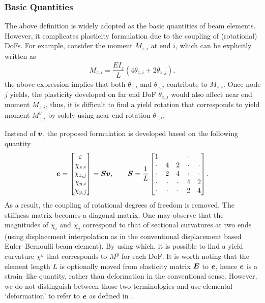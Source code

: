 \subsubsection{Basic Quantities}
The above definition is widely adopted as the basic quantities of beam elements.
However, it complicates plasticity formulation due to the coupling of (rotational) DoFs. For example, consider the moment $M_{z,i}$ at end $i$, which can be explicitly written as
\begin{gather}\label{eq:redefine}
M_{z,i}=\dfrac{EI_z}{L}\left(4\theta_{z,i}+2\theta_{z,j}\right),
\end{gather}
the above expression implies that both $\theta_{z,i}$ and $\theta_{z,j}$ contribute to $M_{z,i}$.
Once node $j$ yields, the plasticity developed on far end DoF $\theta_{z,j}$ would also affect near end moment $M_{z,i}$, thus, it is difficult to find a yield rotation that corresponds to yield moment $M^y_{z,i}$ by solely using near end rotation $\theta_{z,i}$.

Instead of $\bm{v}$, the proposed formulation is developed based on the following quantity
\begin{gather}\label{nm:kinematics}
\bm{e}=\begin{bmatrix}
\varepsilon\\\chi_{z,i}\\\chi_{z,j}\\\chi_{y,i}\\\chi_{y,j}
\end{bmatrix}=\bm{S}\bm{v},\qquad\bm{S}=\dfrac{1}{L}\begin{bmatrix}
1&\cdot&\cdot&\cdot&\cdot\\
\cdot&4&2&\cdot&\cdot\\
\cdot&2&4&\cdot&\cdot\\
\cdot&\cdot&\cdot&4&2\\
\cdot&\cdot&\cdot&2&4
\end{bmatrix}.
\end{gather}
As a result, the coupling of rotational degrees of freedom is removed. The stiffness matrix becomes a diagonal matrix.
One may observe that the magnitudes of $\chi_i$ and $\chi_j$ correspond to that of sectional curvatures at two ends (using displacement interpolation as in the conventional displacement based Euler--Bernoulli beam element).
By using which, it is possible to find a yield curvature $\chi^y$ that corresponds to $M^y$ for each DoF. It is worth noting that the element length $L$ is optionally moved from elasticity matrix $\bm{E}$ to $\bm{e}$, hence $\bm{e}$ is a strain--like quantity, rather than deformation in the conventional sense.
However, we do not distinguish between those two terminologies and use elemental `deformation' to refer to $\bm{e}$ as defined in .

